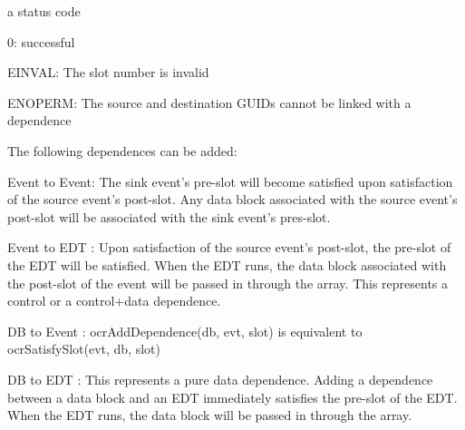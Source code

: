 \returns
a status code
\begin{DoxyItemize}
\item 0\-: successful
\item E\-I\-N\-V\-A\-L\-: The slot number is invalid
\item E\-N\-O\-P\-E\-R\-M\-: The source and destination G\-U\-I\-Ds cannot be linked with a dependence
\end{DoxyItemize}


\descr
The following dependences can be added\-:
\begin{DoxyItemize}
\item Event to Event\-: The sink event's pre-\/slot will become satisfied upon satisfaction of the source event's post-\/slot. Any data block associated with the source event's post-\/slot will be associated with the sink event's pres-\/slot.
\item Event to E\-D\-T \-: Upon satisfaction of the source event's post-\/slot, the pre-\/slot of the E\-D\-T will be satisfied. When the E\-D\-T runs, the data block associated with the post-\/slot of the event will be passed in through the  array. This represents a control or a control+data dependence.
\item D\-B to Event \-: ocr\-Add\-Dependence(db, evt, slot) is equivalent to ocr\-Satisfy\-Slot(evt, db, slot)
\item D\-B to E\-D\-T \-: This represents a pure data dependence. Adding a dependence between a data block and an E\-D\-T immediately satisfies the pre-\/slot of the E\-D\-T. When the E\-D\-T runs, the data block will be passed in through the  array.
\end{DoxyItemize}


